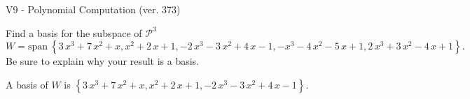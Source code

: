 \begin{exercise}
  \begin{exerciseTitle}V9 - Polynomial Computation (ver. 373)\end{exerciseTitle}
  \begin{exerciseStatement}
    Find a basis for the subspace of \(\mathcal{P}^3\) 
\[W=\mathrm{span}\ \left\{3 \, x^{3} + 7 \, x^{2} + x , x^{2} + 2 \, x + 1 , -2 \, x^{3} - 3 \, x^{2} + 4 \, x - 1 , -x^{3} - 4 \, x^{2} - 5 \, x + 1 , 2 \, x^{3} + 3 \, x^{2} - 4 \, x + 1\right\}.\]
 Be sure to explain why your result is a basis.


  \end{exerciseStatement}
  \begin{exerciseAnswer}
   A basis of \(W\) is  \(\left\{3 \, x^{3} + 7 \, x^{2} + x , x^{2} + 2 \, x + 1 , -2 \, x^{3} - 3 \, x^{2} + 4 \, x - 1\right\}\).
  


  \end{exerciseAnswer}
\end{exercise}